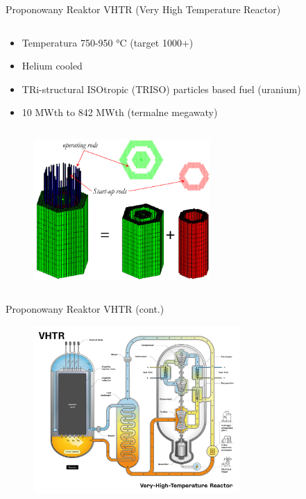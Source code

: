 \begin{columnframe}{Proponowany Reaktor VHTR (Very High Temperature Reactor)}
    \begin{column}{0.5\textwidth}
        \begin{itemize}
            \item Temperatura 750-950 \si{\degreeCelsius} (target 1000+)
            \item Helium cooled
            \item TRi-structural ISOtropic (TRISO) particles based fuel (uranium)
            \item 10 MWth to 842 MWth (termalne megawaty)
        \end{itemize}
    \end{column}
    \begin{column}{0.5\textwidth}
        \begin{figure}
            \centering
            \includegraphics[width=0.6\textwidth, frame]{images/vhtr_core.png}
        \end{figure}
    \end{column}
\end{columnframe}

\begin{frame}{Proponowany Reaktor VHTR (cont.)}
    \begin{figure}
        \centering
        \includegraphics[width=0.7\textwidth, frame]{images/VHTR.png}
    \end{figure}
\end{frame}

